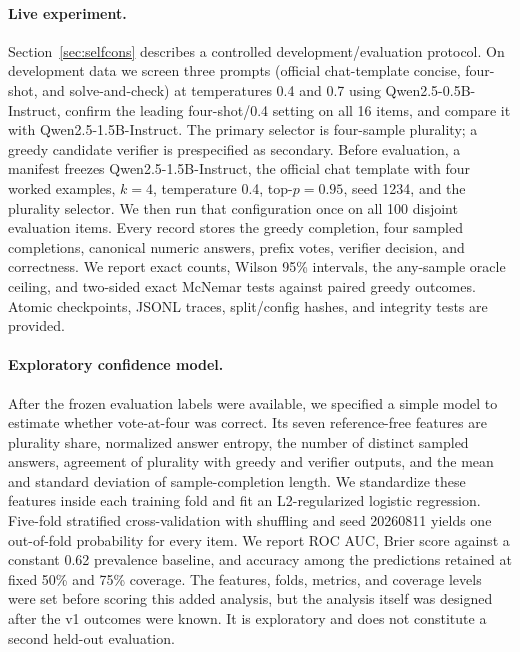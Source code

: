 \paragraph{Live experiment.} Section~\ref{sec:selfcons} describes a controlled
development/evaluation protocol. On development data we screen three prompts
(official chat-template concise, four-shot, and solve-and-check) at
temperatures 0.4 and 0.7 using Qwen2.5-0.5B-Instruct, confirm the leading
four-shot/0.4 setting on all 16 items, and compare it with
Qwen2.5-1.5B-Instruct. The primary selector is four-sample plurality; a greedy
candidate verifier is prespecified as secondary. Before evaluation, a manifest
freezes Qwen2.5-1.5B-Instruct, the official chat template with four worked
examples, $k=4$, temperature 0.4, top-$p=0.95$, seed 1234, and the plurality
selector. We then run that configuration once on all 100 disjoint evaluation
items. Every record stores the greedy completion, four sampled completions,
canonical numeric answers, prefix votes, verifier decision, and correctness.
We report exact counts, Wilson 95\% intervals, the any-sample oracle ceiling,
and two-sided exact McNemar tests against paired greedy outcomes. Atomic
checkpoints, JSONL traces, split/config hashes, and integrity tests are
provided.
\paragraph{Exploratory confidence model.} After the frozen evaluation labels
were available, we specified a simple model to estimate whether vote-at-four
was correct. Its seven reference-free features are plurality share, normalized
answer entropy, the number of distinct sampled answers, agreement of plurality
with greedy and verifier outputs, and the mean and standard deviation of
sample-completion length. We standardize these features inside each training
fold and fit an L2-regularized logistic regression. Five-fold stratified
cross-validation with shuffling and seed 20260811 yields one out-of-fold
probability for every item. We report ROC AUC, Brier score against a constant
0.62 prevalence baseline, and accuracy among the predictions retained at fixed
50\% and 75\% coverage. The features, folds, metrics, and coverage levels were
set before scoring this added analysis, but the analysis itself was designed
after the v1 outcomes were known. It is exploratory and does not constitute a
second held-out evaluation.
